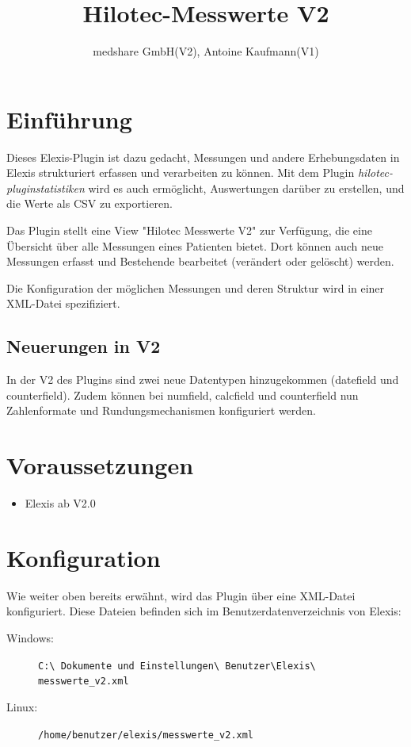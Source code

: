 \documentclass[a4paper]{scrartcl}
\title{Hilotec-Messwerte V2}
\author{medshare GmbH(V2), Antoine Kaufmann(V1)}
\begin{document}
\maketitle
\section{Einführung}
Dieses Elexis-Plugin ist dazu gedacht, Messungen und andere Erhebungsdaten in
Elexis strukturiert erfassen und verarbeiten zu können. Mit dem Plugin
\textit{hilotec-pluginstatistiken} wird es auch ermöglicht, Auswertungen
darüber zu erstellen, und die Werte als CSV zu exportieren.

Das Plugin stellt eine View "Hilotec Messwerte V2" zur Verfügung, die eine Übersicht über alle
Messungen eines Patienten bietet. Dort können auch neue Messungen erfasst und Bestehende bearbeitet (verändert oder gelöscht) werden.

Die Konfiguration der möglichen Messungen und deren Struktur wird in einer
XML-Datei spezifiziert.
\subsection{Neuerungen in V2}
In der V2 des Plugins sind zwei neue Datentypen hinzugekommen (datefield und counterfield). Zudem können bei numfield, calcfield und counterfield nun Zahlenformate und Rundungsmechanismen konfiguriert werden.


\section{Voraussetzungen}
\begin{itemize}
    \item Elexis ab V2.0
\end{itemize}

\section{Konfiguration}
Wie weiter oben bereits erwähnt, wird das Plugin über eine XML-Datei
konfiguriert. Diese Dateien befinden sich im Benutzerdatenverzeichnis von
Elexis:
\begin{description}
    \item[Windows:] \texttt{C:\textbackslash
                                Dokumente und Einstellungen\textbackslash
                                Benutzer\textbackslash Elexis\textbackslash
                                messwerte\_v2.xml}
    \item[Linux:] \texttt{/home/benutzer/elexis/messwerte\_v2.xml}
\end{description}
\end{document}
